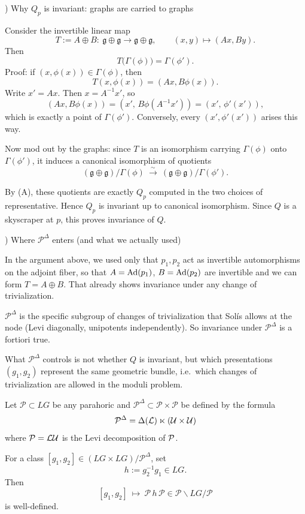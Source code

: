 \documentclass[12pt]{article}
\begin{document}
\medskip

) Why $Q_p$ is invariant: graphs are carried to graphs

Consider the invertible linear map
    \[
    T:=A\oplus B:\ \mathfrak{g}\oplus\mathfrak{g} \longrightarrow \mathfrak{g}\oplus\mathfrak{g},
    \qquad (x,y)\mapsto (Ax,By).
    \]
Then
    \[
    T\bigl(\Gamma(\phi)\bigr)=\Gamma(\phi'). \tag{C}
    \]
Proof: if $(x,\phi(x))\in \Gamma(\phi)$, then
    \[
    T(x,\phi(x))=(Ax,B\phi(x)).
    \]
Write $x'=Ax$. Then $x=A^{-1}x'$, so
    \[
    (Ax,B\phi(x))=(x',\,B\phi(A^{-1}x'))=(x',\,\phi'(x')),
    \]
which is exactly a point of $\Gamma(\phi')$. Conversely, every $(x',\phi'(x'))$ arises this way.

Now mod out by the graphs: since $T$ is an isomorphism carrying $\Gamma(\phi)$ onto $\Gamma(\phi')$, it induces a canonical isomorphism of quotients
    \[
    (\mathfrak{g}\oplus\mathfrak{g})/\Gamma(\phi)\ \xrightarrow{\ \sim\ }\ (\mathfrak{g}\oplus\mathfrak{g})/\Gamma(\phi'). \tag{D}
    \]

By (A), these quotients are exactly $Q_p$ computed in the two choices of representative. Hence $Q_p$ is invariant up to canonical isomorphism. Since $Q$ is a skyscraper at $p$, this proves invariance of $Q$.

\medskip

) Where $\mathcal{P}^\Delta$ enters (and what we actually used)

In the argument above, we used only that $p_1,p_2$ act as invertible automorphisms on the adjoint fiber, so that $A=\operatorname{Ad}(p_1)$, $B=\operatorname{Ad}(p_2)$ are invertible and we can form $T=A\oplus B$. That already shows invariance under any change of trivialization.

$\mathcal{P}^\Delta$ is the specific subgroup of changes of trivialization that Solís allows at the node (Levi diagonally, unipotents independently). So invariance under $\mathcal{P}^\Delta$ is a fortiori true.

What $\mathcal{P}^\Delta$ controls is not whether $Q$ is invariant, but which presentations $(g_1,g_2)$ represent the same geometric bundle, i.e.\ which changes of trivialization are allowed in the moduli problem.

Let $\mathcal{P}\subset LG$ be any parahoric and $\mathcal{P}^\Delta\subset \mathcal{P}\times\mathcal{P}$
be defined by the formula
\[\mathcal{P}^\Delta = \Delta({\mathcal{L}}) \ltimes ({\mathcal{U}} \times {\mathcal{U}})\] where ${\mathcal{P}} = {\mathcal{L}}{\mathcal{U}}$ is the Levi decomposition of ${\mathcal{P}}$.

For a class $[g_1,g_2]\in (LG\times LG)/\mathcal{P}^\Delta$, set
\[
h:=g_2^{-1}g_1\in LG.
\]
Then
\[
[g_1,g_2]\ \longmapsto\ \mathcal{P}\,h\,\mathcal{P} \in \mathcal{P}\backslash LG/\mathcal{P}
\]
is well-defined.
\end{document}
